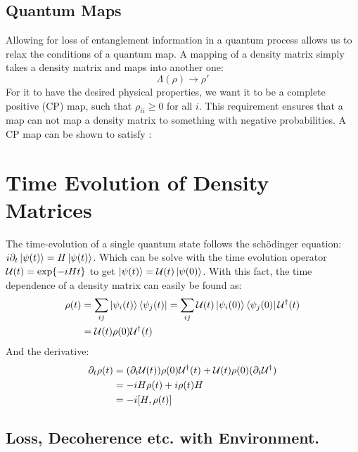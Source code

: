 \subsection{Quantum Maps}
Allowing for loss of entanglement information in a quantum process allows us to relax the conditions of a quantum map. A mapping of a density matrix simply takes a density matrix and maps into another one:
\begin{equation}
    \Lambda(\rho) \to \rho'
\end{equation}
For it to have the desired physical properties, we want it to be a complete positive (CP) map, such that $\rho_{ii} \geq 0$ for all $i$. This requirement ensures that a map can not map a density matrix to something with negative probabilities. A CP map can be shown to satisfy \cite{greenbraum}:
\begin{equation}
    
\end{equation}

\section{Time Evolution of Density Matrices}
The time-evolution of a single quantum state follows the schödinger equation: $i\partial_t\ket{\psi(t)} = H\ket{\psi(t)}$. Which can be solve with the time evolution operator $\mathcal{U}(t) = \exp{-iHt}$ to get $\ket{\psi(t)} = \mathcal{U}(t)\ket{\psi(0)}$. With this fact, the time dependence of a density matrix can easily be found as:
\begin{align}
    \rho(t) &= \sum_{ij} \ket{\psi_i(t)}\bra{\psi_j(t)} = \sum_{ij} \mathcal{U}(t) \ket{\psi_i(0)}\bra{\psi_j(0)} \mathcal{U}^\dagger(t) \nonumber \\
    &= \mathcal{U}(t) \rho(0) \mathcal{U}^\dagger(t)
\end{align}
And the derivative:
\begin{align}
    \partial_t \rho(t) &= (\partial_t \unitary(t)) \rho(0)\unitary^\dagger(t) + \unitary(t)\rho(0)(\partial_t \unitary^\dagger) \nonumber \\
    &= -iH \rho(t) +i \rho(t) H \nonumber \\
    &= - i \comm{H}{\rho(t)}
\end{align}

\subsection{Loss, Decoherence etc. with Environment.}